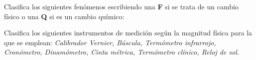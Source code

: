 \documentclass[addpoints, 12pt]{exam}
\begin{document}
\begin{questions}



\question Clasifica los siguientes fenómenos escribiendo una \textbf{F} si se trata de un cambio físico o una \textbf{Q} si es un cambio químico:

















\vspace{0.5cm}


\vspace{0.5cm}







\vspace{0.3cm}

\question Clasifica los siguientes instrumentos de medición según la magnitud física para la que se emplean: \textit{Calibrador Vernier, Báscula, Termómetro infrarrojo, Cronómetro, Dinamómetro, Cinta métrica, Termómetro clínico, Reloj de sol.}


\end{questions}
\end{document}
